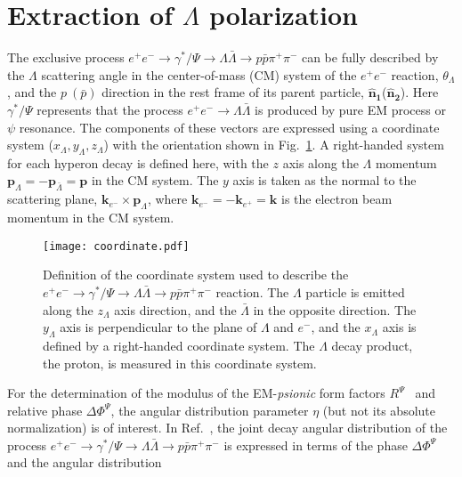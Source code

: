 \documentclass[a4paper,11pt]{article}
\begin{document}
\section{Extraction of $\Lambda$ polarization}
The exclusive process $e^+e^-\to\gamma^*/\Psi\to\Lambda\bar\Lambda\to p\bar{p}\pi^{+}\pi^{-}$ can be fully described by the $\Lambda$ scattering angle in the {center-of-mass} (CM) system of the $e^+e^-$ reaction, $\theta_{\Lambda}$, and the $p~(\bar{p})$ direction in the rest frame of its parent particle, $\boldsymbol{\hat{n}_{1}}$($\boldsymbol{\hat{n}_{2}}$). 
Here $\gamma^*/\Psi$ represents that the process $e^+e^- \to\Lambda\bar\Lambda$ is produced by pure EM process or $\psi$ resonance.
{The components of these vectors are expressed using a coordinate system ($x_\Lambda,y_\Lambda, z_\Lambda$) with the orientation shown in Fig.~\ref{fig:helicity_frame}.
 A right-handed system  for each hyperon decay is defined here, with the $z$ axis along the $\Lambda$ momentum $\textbf{p}_{\Lambda} = - \textbf{p}_{\bar{\Lambda}} = \textbf{p}$ in the CM system.} The $y$ axis is taken as the normal to the scattering plane, $\textbf{k}_{e^{-}} \times \textbf{p}_{\Lambda}$, where $\textbf{k}_{e^{-}} = - \textbf{k}_{e^{+}} = \textbf{k}$ is the electron beam momentum in the CM system. 
\begin{figure}[!htbp]
	\begin{center}
\texttt{[image: coordinate.pdf]}
	\end{center}
\caption{
Definition of the coordinate system used to describe the {$e^+e^-\to\gamma^*/\Psi\to\Lambda\bar\Lambda\to p\bar{p}\pi^{+}\pi^{-}$ reaction}. The $\Lambda$ particle is emitted along the $z_{\Lambda}$ axis direction, and the $\bar\Lambda$ in the opposite direction. The $y_{\Lambda}$ axis is perpendicular to the plane of $\Lambda$ and $e^{-}$, and the $x_{\Lambda}$ axis is defined by a right-handed coordinate system. 
The $\Lambda$ decay product, the proton, is measured in this coordinate system.}
\label{fig:helicity_frame}
\end{figure}
For the determination of the {modulus of the EM-\textit{psionic} form factors} $R^{\Psi}$~\cite{BESIII:2021cvv} and relative phase $\Delta\Phi^{\Psi}$, the angular distribution parameter $\eta$ (but not its absolute normalization) is of interest. In Ref.~\cite{Faldt:2017kgy}, the joint decay angular distribution of the process {$e^+e^-\to\gamma^*/\Psi\to\Lambda\bar\Lambda\to p\bar{p}\pi^{+}\pi^{-}$} is expressed in terms of the phase $\Delta\Phi^{\Psi}$ and the angular distribution
\end{document}

